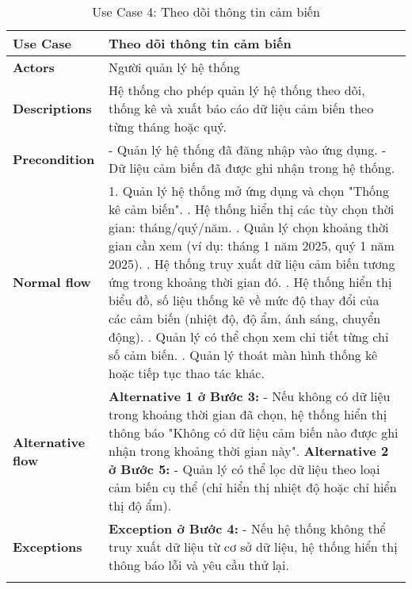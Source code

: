 \begin{longtable}{|p{}|p{}|}
    \hline
    \textbf{Use Case}         & \textbf{Theo dõi thông tin cảm biến}                                                                             \\
    \hline
    \textbf{Actors}           & Người quản lý hệ thống                                                                                           \\
    \hline
    \textbf{Descriptions}     & Hệ thống cho phép quản lý hệ thống theo dõi, thống kê và xuất báo cáo dữ liệu cảm biến theo từng tháng hoặc quý. \\
    \hline
    \textbf{Precondition}     &
    - Quản lý hệ thống đã đăng nhập vào ứng dụng. \newline
    - Dữ liệu cảm biến đã được ghi nhận trong hệ thống.                                                                                          \\
    \hline
    \textbf{Normal flow}      &
    1. Quản lý hệ thống mở ứng dụng và chọn "Thống kê cảm biến". \newline
    2. Hệ thống hiển thị các tùy chọn thời gian: tháng/quý/năm. \newline
    3. Quản lý chọn khoảng thời gian cần xem (ví dụ: tháng 1 năm 2025, quý 1 năm 2025). \newline
    4. Hệ thống truy xuất dữ liệu cảm biến tương ứng trong khoảng thời gian đó. \newline
    5. Hệ thống hiển thị biểu đồ, số liệu thống kê về mức độ thay đổi của các cảm biến (nhiệt độ, độ ẩm, ánh sáng, chuyển động). \newline
    6. Quản lý có thể chọn xem chi tiết từng chỉ số cảm biến. \newline
    7. Quản lý thoát màn hình thống kê hoặc tiếp tục thao tác khác.                                                                              \\
    \hline
    \textbf{Alternative flow} &
    \textbf{Alternative 1 ở Bước 3:} \newline
    - Nếu không có dữ liệu trong khoảng thời gian đã chọn, hệ thống hiển thị thông báo "Không có dữ liệu cảm biến nào được ghi nhận trong khoảng thời gian này". \newline
    \textbf{Alternative 2 ở Bước 5:} \newline
    - Quản lý có thể lọc dữ liệu theo loại cảm biến cụ thể (chỉ hiển thị nhiệt độ hoặc chỉ hiển thị độ ẩm).                                      \\
    \hline
    \textbf{Exceptions}       &
    \textbf{Exception ở Bước 4:} \newline
    - Nếu hệ thống không thể truy xuất dữ liệu từ cơ sở dữ liệu, hệ thống hiển thị thông báo lỗi và yêu cầu thử lại.                             \\
    \hline
    \caption{Use Case 4: Theo dõi thông tin cảm biến}
    \label{tab:usecase4}
\end{longtable}

